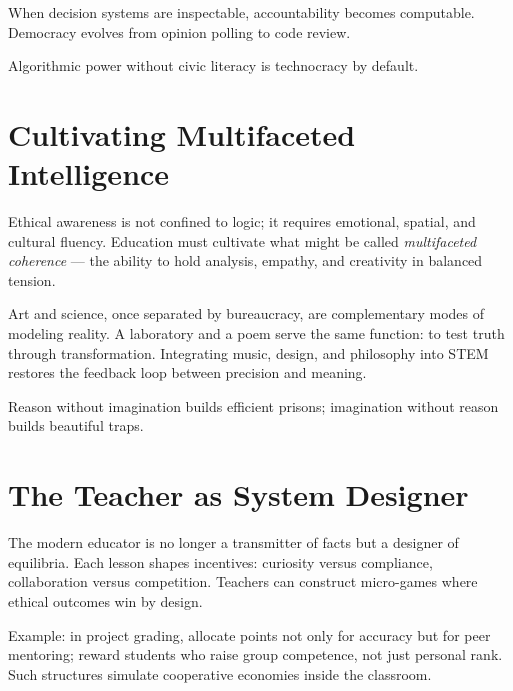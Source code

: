 \documentclass[12pt,twoside]{book}
\begin{document}
When decision systems are inspectable, accountability becomes computable.  
Democracy evolves from opinion polling to code review.\\

\begin{keyidea}
Algorithmic power without civic literacy is technocracy by default.
\end{keyidea}

\section{Cultivating Multifaceted Intelligence}

Ethical awareness is not confined to logic; it requires emotional, spatial, and cultural fluency.  
Education must cultivate what might be called \emph{multifaceted coherence} — the ability to hold analysis, empathy, and creativity in balanced tension.

Art and science, once separated by bureaucracy, are complementary modes of modeling reality.  
A laboratory and a poem serve the same function: to test truth through transformation.  
Integrating music, design, and philosophy into STEM restores the feedback loop between precision and meaning.\\

\begin{keyidea}
Reason without imagination builds efficient prisons; imagination without reason builds beautiful traps.
\end{keyidea}

\section{The Teacher as System Designer}

The modern educator is no longer a transmitter of facts but a designer of equilibria.  
Each lesson shapes incentives: curiosity versus compliance, collaboration versus competition.  
Teachers can construct micro-games where ethical outcomes win by design.

Example: in project grading, allocate points not only for accuracy but for peer mentoring; reward students who raise group competence, not just personal rank.  
Such structures simulate cooperative economies inside the classroom.\\
\end{document}
